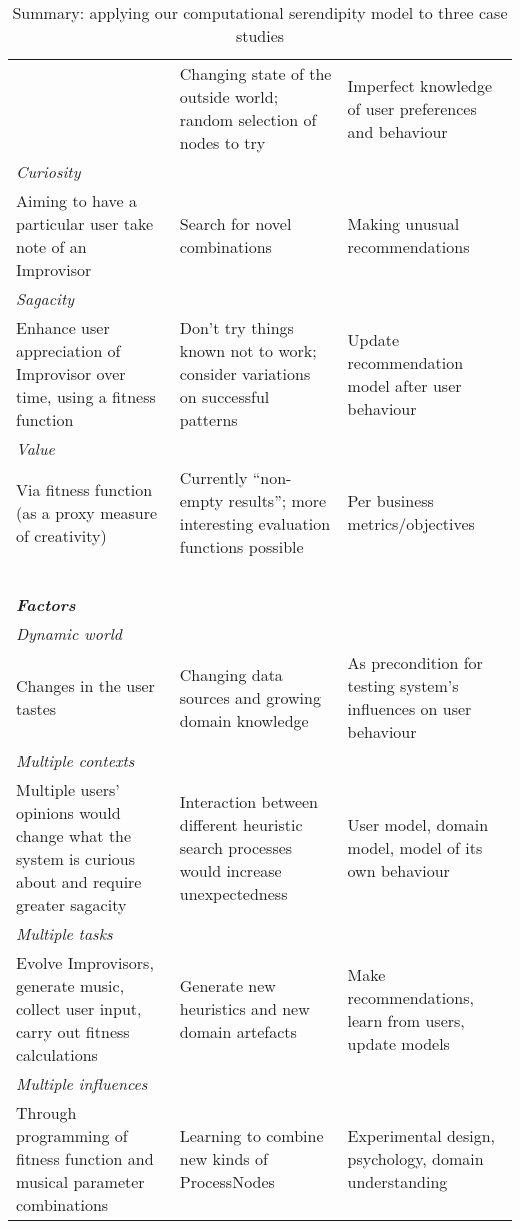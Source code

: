 \begin{table}[p]
{\begin{tabular}{p{1.4in}@{\hspace{.1in}}p{1.4in}@{\hspace{.1in}}p{1.4in}}
& Changing state of the outside world; random selection of nodes to try 
& Imperfect knowledge of user preferences and behaviour\\
\multicolumn{3}{l}{\em Curiosity} \\[-.1cm]
Aiming to have a particular user take note of an Improvisor
& Search for novel combinations 
& Making unusual recommendations\\
\multicolumn{3}{l}{\em Sagacity} \\[-.1cm]
Enhance user appreciation of Improvisor over time, using a fitness function
& Don't try things known not to work; consider variations on successful patterns 
& Update recommendation model after user behaviour \\
\multicolumn{3}{l}{\em Value} \\[-.1cm]
Via fitness function (as a proxy measure of creativity)
& Currently ``non-empty results''; more interesting evaluation functions possible 
& Per business metrics/objectives\\
\cline{1-3}
~\\[-.1cm]
\multicolumn{3}{l}{\em \textbf{Factors}} \\
\cline{1-3}
\multicolumn{3}{l}{\em Dynamic world} \\[-.1cm]
Changes in the user tastes
& Changing data sources and growing domain knowledge 
& As precondition for testing system's influences on user behaviour\\
\multicolumn{3}{l}{\em Multiple contexts} \\[-.1cm]
Multiple users' opinions would change what the system is curious about and require greater sagacity
& Interaction between different heuristic search processes would increase unexpectedness 
& User model, domain model, model of its own behaviour\\
\multicolumn{3}{l}{\em Multiple tasks} \\[-.1cm]
Evolve Improvisors, generate music, collect user input, carry out fitness calculations
& Generate new heuristics and new domain artefacts 
& Make recommendations, learn from users, update models\\
\multicolumn{3}{l}{\em Multiple influences} \\[-.1cm]
Through programming of fitness function and musical parameter combinations
& Learning to combine new kinds of ProcessNodes
& Experimental design, psychology, domain understanding\\
\cline{1-3}
\end{tabular}
\par}
\normalsize
\bigskip

\caption{Summary: applying our computational serendipity model to three case studies\label{caseStudies}}
\end{table}

